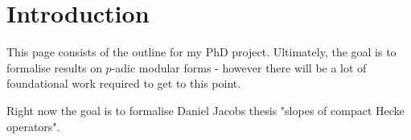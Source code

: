 \section{Introduction}

This page consists of the outline for my PhD project. Ultimately, the goal is to formalise results
on $p$-adic modular forms - however there will be a lot of foundational work required to get to this
point.

Right now the goal is to formalise Daniel Jacobs thesis "slopes of compact Hecke operators".
